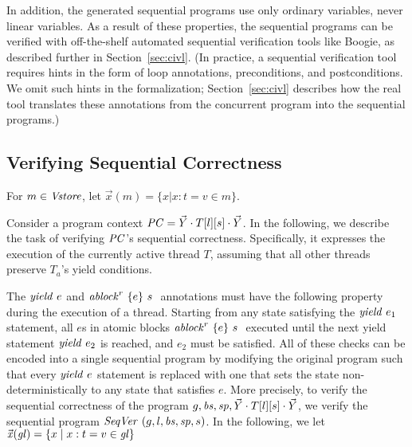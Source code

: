 In addition, the generated sequential programs use only ordinary variables, never linear variables.
As a result of these properties, the sequential programs can be verified with off-the-shelf automated sequential verification tools like Boogie, as described further in Section~\ref{sec:civl}.
(In practice, a sequential verification tool requires hints in the form of loop annotations, preconditions, and postconditions.
We omit such hints in the formalization; Section~\ref{sec:civl} describes how the real \civl tool translates these annotations from the concurrent program into the sequential programs.)


\subsection{Verifying Sequential Correctness}
For $m \in \Vstore$, let $ \vec{x}(m) = \{ x  |   x : t = v \in m \} $. 

Consider a program context $\ProgCtxt = \YieldingThreads \cdot T[\varsL][s] \cdot \YieldingThreads$. In the following, we describe the task of verifying $\ProgCtxt$'s sequential correctness. Specifically, it expresses the execution of the currently active thread $T$, assuming that all other threads preserve $T_a$'s yield conditions.

The $\yield{e}$ and $\ablock{e}{s}{r}$ annotations must have the following property during the execution of a thread. Starting from any state satisfying the $\yield{e_1}$ statement, all $e$s in atomic blocks $\ablock{e}{s}{r}$ executed until the next yield statement $\yield{e_2}$ is reached, and $e_2$ must be satisfied. All of these checks can be encoded into a single sequential program by modifying the original program such that every $\yield{e}$ statement is replaced with one that sets the state non-deterministically to any state that satisfies $e$. More precisely, to verify the sequential correctness of the program $\varsG, \bodies, \specs, \YieldingThreads \cdot T[\varsL][s] \cdot \YieldingThreads$, we verify the sequential program $\SeqVer(\varsG, \varsL, \bodies, \specs, s)$. In the following, we let 
$\xs(\vars) = \{x \mid x:t = v \in \vars\}$


